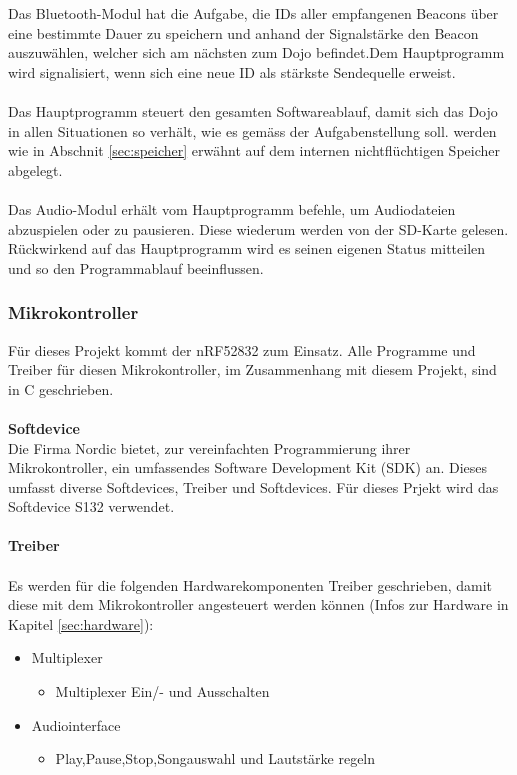 \documentclass[10pt,a4paper,oneside]{99_fhnwreport}
\begin{document}
Das Bluetooth-Modul hat die Aufgabe, die IDs aller empfangenen Beacons über eine bestimmte Dauer zu speichern und anhand der Signalstärke den Beacon auszuwählen, welcher sich am nächsten zum Dojo befindet.Dem Hauptprogramm wird signalisiert, wenn sich eine neue ID als stärkste Sendequelle erweist.\\
\\
Das Hauptprogramm steuert den gesamten Softwareablauf, damit sich das Dojo in allen Situationen so verhält, wie es gemäss der Aufgabenstellung soll. werden wie in Abschnit \ref{sec:speicher} erwähnt auf dem internen nichtflüchtigen Speicher abgelegt.\\
\\
Das Audio-Modul erhält vom Hauptprogramm befehle, um Audiodateien abzuspielen oder zu pausieren. Diese wiederum werden von der SD-Karte gelesen. Rückwirkend auf das Hauptprogramm wird es seinen eigenen Status mitteilen und so den Programmablauf beeinflussen.

\subsubsection{Mikrokontroller}
Für dieses Projekt kommt der nRF52832 zum Einsatz. Alle Programme und Treiber für diesen Mikrokontroller, im Zusammenhang mit diesem Projekt, sind in C geschrieben.\\
\\
\textbf{Softdevice}\\
Die Firma Nordic bietet, zur vereinfachten Programmierung ihrer Mikrokontroller, ein umfassendes Software Development Kit (SDK) an. Dieses umfasst diverse Softdevices, Treiber und Softdevices. Für dieses Prjekt wird das Softdevice S132 verwendet.\\
\\
\textbf{Treiber}\\
\\
Es werden für die folgenden Hardwarekomponenten Treiber geschrieben, damit diese mit dem Mikrokontroller angesteuert werden können (Infos zur Hardware in Kapitel \ref{sec:hardware}):
\begin{itemize}
	\item{Multiplexer}
	\begin{itemize}
		\item{Multiplexer Ein/- und Ausschalten}
	\end{itemize}
\end{itemize}

\begin{itemize}
	\item{Audiointerface}
	\begin{itemize}
		\item{Play,Pause,Stop,Songauswahl und Lautstärke regeln}
	\end{itemize}
\end{itemize}
\end{document}
